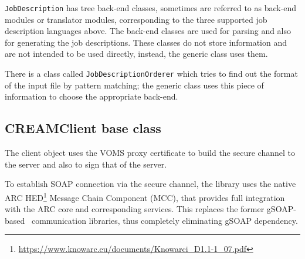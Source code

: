 \documentclass{article}
\begin{document}
\texttt{JobDescription} has tree back-end classes, sometimes are referred to as back-end modules or translator modules, corresponding to the three supported job description languages above. The back-end classes are used for parsing and also for generating the job descriptions. These classes do not store information and are not intended to be used directly, instead, the generic class uses them.

There is a class called \texttt{JobDescriptionOrderer} which tries to find out the format of the input file by pattern matching; the generic class uses this piece of information to choose the appropriate back-end.

\begin{figure}[ht]
\end{figure}

\subsection{CREAMClient base class}
\label{CREAMClient}
The client object uses the VOMS proxy certificate to build the secure channel to the server and also to sign that of the server.

To establish SOAP connection via the secure channel, the library uses the native ARC HED\footnote{\url{https://www.knowarc.eu/documents/Knowarci\_D1.1-1\_07.pdf}} Message Chain Component (MCC), that provides full integration with the ARC core and corresponding services. This replaces the former gSOAP-based~\cite{gsoap} communication libraries, thus completely eliminating gSOAP dependency.
\end{document}
